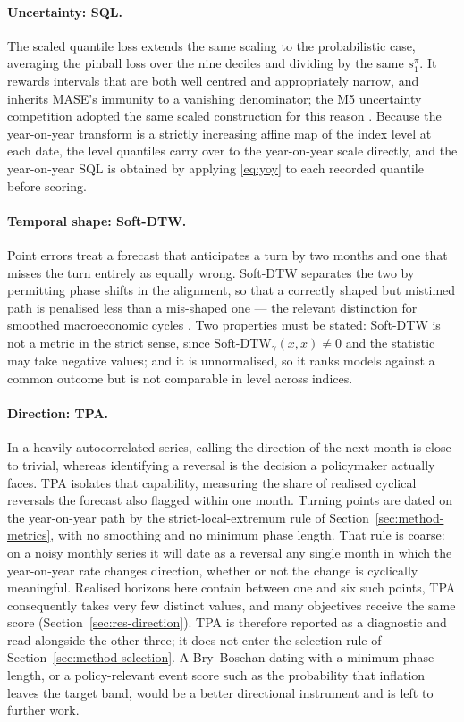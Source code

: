 \documentclass[12pt]{article}
\begin{document}
\paragraph{Uncertainty: SQL.}
The scaled quantile loss extends the same scaling to the probabilistic case,
averaging the pinball loss over the nine deciles and dividing by the same
$s_1^{\pi}$. It
rewards intervals that are both well centred and appropriately narrow, and
inherits MASE's immunity to a vanishing denominator; the M5 uncertainty
competition adopted the same scaled construction for this reason
\citep{makridakis2022m5unc}. Because the year-on-year transform is a strictly
increasing affine map of the index level at each date, the level quantiles carry
over to the year-on-year scale directly, and the year-on-year SQL is obtained by
applying \eqref{eq:yoy} to each recorded quantile before scoring.

\paragraph{Temporal shape: Soft-DTW.}
Point errors treat a forecast that anticipates a turn by two months and one that
misses the turn entirely as equally wrong. Soft-DTW separates the two by
permitting phase shifts in the alignment, so that a correctly shaped but
mistimed path is penalised less than a mis-shaped one --- the relevant
distinction for smoothed macroeconomic cycles \citep{cuturi2017}. Two properties
must be stated: Soft-DTW is not a metric in the strict sense, since
$\text{Soft-DTW}_\gamma(x,x) \ne 0$ and the statistic may take negative values;
and it is unnormalised, so it ranks models against a common outcome but is not
comparable in level across indices.

\paragraph{Direction: TPA.}
In a heavily autocorrelated series, calling the direction of the next month is
close to trivial, whereas identifying a reversal is the decision a policymaker
actually faces. TPA isolates that capability, measuring the share of realised
cyclical reversals the forecast also flagged within one month. Turning points
are dated on the year-on-year path by the strict-local-extremum rule of
Section~\ref{sec:method-metrics}, with no smoothing and no minimum phase
length. That rule is coarse: on a noisy monthly series it will date as a
reversal any single month in which the year-on-year rate changes direction,
whether or not the change is cyclically meaningful. Realised horizons here
contain between one and six such points, TPA consequently takes very few
distinct values, and many objectives receive the same score
(Section~\ref{sec:res-direction}). TPA is therefore reported as a diagnostic
and read alongside the other three; it does not enter the selection rule of
Section~\ref{sec:method-selection}. A Bry--Boschan dating with a minimum phase
length, or a policy-relevant event score such as the probability that inflation
leaves the target band, would be a better directional instrument and is left to
further work.
\end{document}
